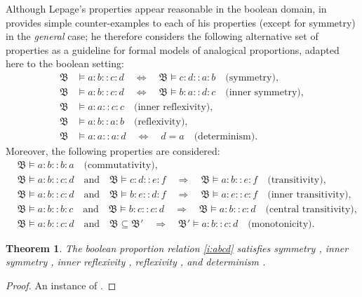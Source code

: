 \documentclass[11pt]{amsart}
\newtheorem{theorem}{Theorem}
\theoremstyle{definition} %
\begin{document}
Although Lepage's properties appear reasonable in the boolean domain, in  provides simple counter-examples to each of his properties (except for symmetry) in the \textit{general} case; he therefore considers the following alternative set of properties as a guideline for formal models of analogical proportions, adapted here to the boolean setting:
\begin{align}
	\label{equ:symmetry} \mathfrak B&\models a:b::c:d\quad\Leftrightarrow\quad\mathfrak B\models c:d::a:b\quad\text{(symmetry)},\\
	\label{equ:inner_symmetry} \mathfrak B&\models a:b::c:d \quad\Leftrightarrow\quad \mathfrak B\models b:a::d:c\quad\text{(inner symmetry)},\\
	\label{equ:inner_reflexivity} \mathfrak B&\models a:a::c:c\quad\text{(inner reflexivity)},\\
	\label{equ:reflexivity} \mathfrak B&\models a:b::a:b\quad\text{(reflexivity)},\\
	\label{equ:determinism} \mathfrak B&\models a:a::a:d \quad\Leftrightarrow\quad d=a\quad\text{(determinism)}.
\end{align} Moreover, the following properties are considered:
\begin{align} 
	&\label{equ:commutativity} \mathfrak B\models a:b::b:a\quad\text{(commutativity),}\\
	&\mathfrak B\models a:b::c:d \quad\text{and}\quad \mathfrak B\models c:d::e:f \quad\Rightarrow\quad \mathfrak B\models a:b::e:f \quad\text{(transitivity)},\\
	&\label{equ:inner_transitivity} \mathfrak B\models a:b::c:d \quad\text{and}\quad \mathfrak B\models b:e::d:f \quad\Rightarrow\quad \mathfrak B\models a:e::c:f \quad\text{(inner transitivity)},\\
	&\label{equ:central_transitivity} \mathfrak B\models a:b::b:c \quad\text{and}\quad \mathfrak B\models b:c::c:d \quad\Rightarrow\quad \mathfrak B\models a:b::c:d \quad\text{(central transitivity)},\\
	&\mathfrak B\models a:b::c:d \quad\text{and}\quad \mathfrak B\subseteq\mathfrak B' \quad\Rightarrow\quad \mathfrak B'\models a:b::c:d \quad\text{(monotonicity)}.
\end{align}

\begin{theorem}\label{t:p} The boolean proportion relation \ref{i:abcd} satisfies symmetry , inner symmetry , inner reflexivity , reflexivity , and determinism .
\end{theorem}
\begin{proof} An instance of .
\end{proof}
\end{document}

